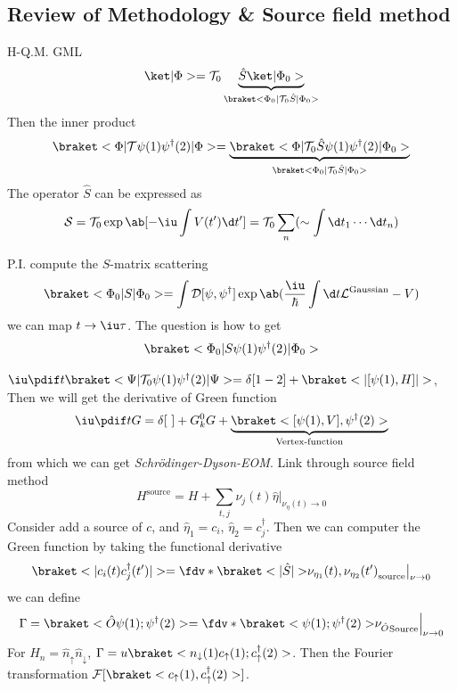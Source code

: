\subsection{Review of Methodology \& Source field method}

\begin{enumext}
  \item H-Q.M. GML
  \begin{equation}
    \ket|\Phi> = \mathcal T_0
    \underbrace{\hat S\ket|\Phi_0>}_{\braket<\Phi_0|\mathcal T_0\hat S|\Phi_0>}
  \end{equation}
  Then the inner product
  \begin{equation}
    \braket<\Phi|\mathcal T \psi(1) \psi^\dagger(2)|\Phi>
  = \underbrace{\braket<\Phi|\mathcal T_0 \hat S \psi(1) \psi^\dagger(2)|\Phi_0>}_{\braket<\Phi_0|\mathcal T_0\hat S|\Phi_0>}
  \end{equation}
  The operator $\hat S$ can be expressed as
  \begin{equation}
    \mathcal S = \mathcal T_0 \exp\ab[-\iu\int V(t') \d t'] = \mathcal T_0 \sum_n  (\sim \int \d t_1 \cdots \d t_n)
  \end{equation}
  \item P.I. compute the $S$-matrix scattering
  \begin{equation}
    \braket<\Phi_0|S|\Phi_0>
  = \int \mathcal D[\psi,\psi^\dagger] \exp\ab(\frac\iu\hbar \int \d t \mathcal L^\text{Gaussian} - V)
  \end{equation}
  we can map $t \to \iu \tau$. The question is how to get
  \begin{equation}
    \braket<\Phi_0|S\psi(1)\psi^\dagger(2)|\Phi_0>
  \end{equation}
  \item $\iu\pdif t \braket<\Psi|\mathcal T_0 \psi(1) \psi^\dagger(2)|\Psi> = \delta [1 - 2] + \braket<|[\psi(1), H]|>$,
  Then we will get the derivative of Green function
  \[
    \iu \pdif t G = \delta[~] + G_k^0 G + \underbrace{\braket<[\psi(1), V], \psi^\dagger(2)>}_\text{Vertex-function}
  \]
  from which we can get \emph{Schr\"odinger-Dyson-EOM}.
  Link through source field method
  \begin{equation}
    H^\text{source} = H + \sum_{t,j} \nu_j(t) \hat\eta \big|_{\nu_\eta(t) \to 0}
  \end{equation}
  Consider add a source of $c$, and $\hat\eta_1 = c_i$, $\hat\eta_2 = c_j^\dagger$. Then we can computer the Green function by taking the functional derivative
  \begin{equation}
    \braket<|c_i(t) c_j^\dagger(t')|>
  = \fdv*{\braket<|\hat S|>}{\nu_{\eta_1}(t), \nu_{\eta_2}(t')}_{\text{source}}
    \big|_{\nu\to0}
  \end{equation}
  we can define
  \begin{equation}
    \Gamma = \braket<\hat O\psi(1); \psi^\dagger(2)> = \fdv*{\braket<\psi(1); \psi^\dagger(2)>}{\nu_{\hat O}}_{\text{Source}} \Big|_{\nu\to 0}
  \end{equation}
  For $H_n = \hat n_\uparrow \hat n_\downarrow$, $\Gamma = u\braket<n_\downarrow(1) c_\uparrow(1); c_\uparrow^\dagger(2)>$. Then the Fourier transformation
  $\mathcal F[\braket<c_\uparrow(1), c_\uparrow^\dagger(2)>]$.


\end{enumext}
